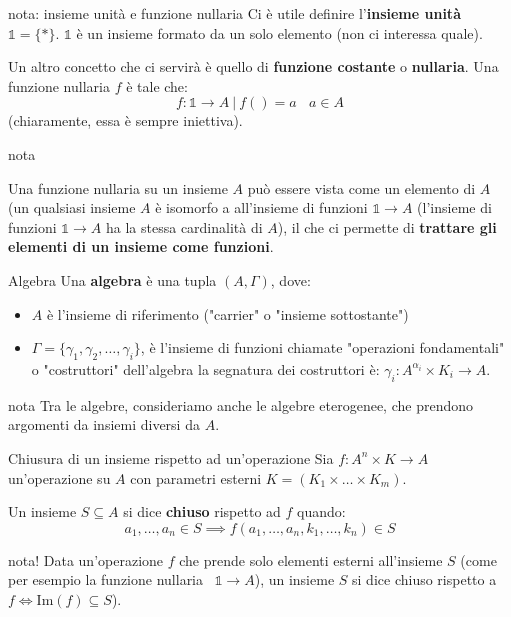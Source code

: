 \documentclass[a4paper,11pt]{report}
\begin{document}
\begin{gbox}{nota: insieme unità e funzione nullaria}
    Ci è utile definire l'\textbf{insieme unità} \( \mathbb{1} = \{*\} \). \( \mathbb{1} \) è un insieme formato da un solo elemento (non ci interessa quale). 

    Un altro concetto che ci servirà è quello di \textbf{funzione costante} o \textbf{nullaria}. Una funzione nullaria \( f \) è tale che:
    \[
        f: \mathbb{1} \to A \ | \ f() = a \ \ \ \ a\in A
    \]
    (chiaramente, essa è sempre iniettiva).

    \begin{gbox}{nota}

        Una funzione nullaria su un insieme \( A \) può essere vista come un elemento di \( A \) (un qualsiasi insieme \( A \) è isomorfo a all'insieme di funzioni \( \mathbb{1}\to A \) (l'insieme di funzioni \( \mathbb{1}\to A \) ha la stessa cardinalità di \( A \)), il che ci permette di \textbf{trattare gli elementi di un insieme come funzioni}.


    \end{gbox}
\end{gbox}

\begin{defbox}{Algebra}{}
    Una \textbf{algebra} è una tupla \( (A, \Gamma) \), dove:
    \begin{itemize}
        \item \( A \) è l'insieme di riferimento ("carrier" o "insieme sottostante") 
        \item \( \Gamma = \{\gamma_1, \gamma_2, \dots, \gamma_i\} \), è l'insieme di funzioni chiamate "operazioni fondamentali" o "costruttori" dell'algebra
            \subitem la segnatura dei costruttori è: \( \gamma_i:A^{\alpha_i}\times K_i \to A \).

    \end{itemize}
    \begin{gbox}{nota}
        Tra le algebre, consideriamo anche le algebre eterogenee, che prendono argomenti da insiemi diversi da \( A \).
    \end{gbox}
\end{defbox}

\begin{defbox}{Chiusura di un insieme rispetto ad un'operazione}{}
    Sia \( f: A^n \times K \to A \) un'operazione su \( A \) con parametri esterni \( K = (K_1 \times \dots \times K_m) \). 

    Un insieme \( S \subseteq A \) si dice \textbf{chiuso} rispetto ad \( f \) quando:
    \[
        a_1, \dots, a_n \in S \implies f( a_1, \dots, a_n,  k_1, \dots, k_n) \in S
    \]

    \begin{gbox}[colframe=RedViolet]{nota!}
        Data un'operazione \( f \) che prende solo elementi esterni all'insieme \( S \) (come per esempio la funzione nullaria \ \( \mathbb{1} \to A \)), un insieme \( S \) si dice chiuso rispetto a \(f \iff \text{Im}(f) \subseteq S \)).

    \end{gbox}
\end{defbox}
\end{document}
